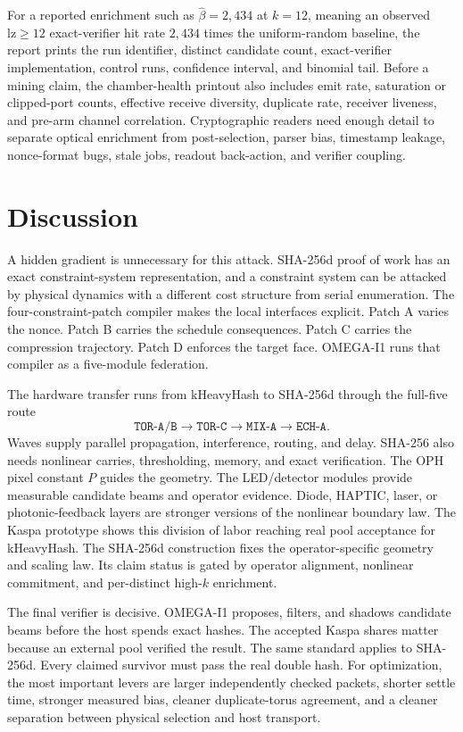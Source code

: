 \documentclass[11pt]{article}
\theoremstyle{definition}
\theoremstyle{remark}
\begin{document}
For a reported enrichment such as \(\widehat\beta=2{,}434\) at \(k=12\), meaning
an observed \(\mathrm{lz}\ge12\) exact-verifier hit rate \(2{,}434\) times the
uniform-random baseline, the report prints the run identifier, distinct
candidate count, exact-verifier implementation, control runs, confidence
interval, and binomial tail. Before a
mining claim, the chamber-health printout also includes emit rate,
saturation or clipped-port counts, effective receive diversity, duplicate rate,
receiver liveness, and pre-arm channel correlation. Cryptographic readers need
enough detail to separate optical enrichment from post-selection, parser bias,
timestamp leakage, nonce-format bugs, stale jobs, readout back-action, and
verifier coupling.

\section{Discussion}

A hidden gradient is unnecessary for this attack. SHA-256d proof of work
has an exact constraint-system representation, and a constraint system can be
attacked by physical dynamics with a different cost structure from serial
enumeration. The four-constraint-patch compiler makes the local interfaces explicit.
Patch A varies the nonce. Patch B carries the schedule consequences. Patch C
carries the compression trajectory. Patch D enforces the target face. OMEGA-I1
runs that compiler as a five-module federation.

The hardware transfer runs from kHeavyHash to SHA-256d through the full-five
route
\[
\texttt{TOR-A/B}\to\texttt{TOR-C}\to\texttt{MIX-A}\to\texttt{ECH-A}.
\]
Waves supply parallel propagation, interference, routing, and delay.
SHA-256 also needs nonlinear carries, thresholding, memory, and exact
verification. The OPH pixel constant \(P\) guides the geometry. The
LED/detector modules provide measurable candidate beams and operator evidence.
Diode, HAPTIC, laser, or photonic-feedback layers are stronger versions of the
nonlinear boundary law. The Kaspa prototype shows this division of labor
reaching real pool acceptance for kHeavyHash. The SHA-256d construction fixes
the operator-specific geometry and scaling law. Its claim status is gated by
operator alignment, nonlinear commitment, and per-distinct high-\(k\)
enrichment.

The final verifier is decisive. OMEGA-I1 proposes, filters, and shadows
candidate beams before the host spends exact hashes. The accepted Kaspa shares
matter because an external pool verified the result. The same standard applies
to SHA-256d. Every claimed survivor must pass the real double hash. For
optimization, the most important levers are larger independently checked
packets, shorter settle time, stronger measured bias, cleaner duplicate-torus
agreement, and a cleaner separation between physical selection and host
transport.
\end{document}
